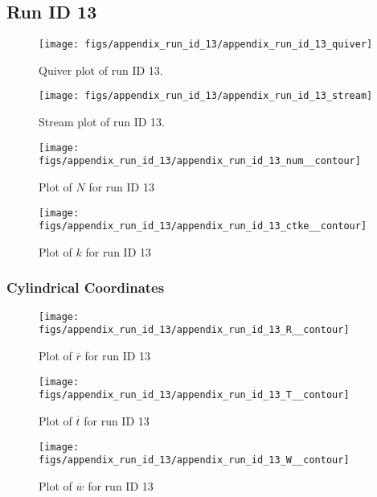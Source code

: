 \subsection{Run ID 13}
\begin{figure}[H]
\centering
\texttt{[image: figs/appendix\_run\_id\_13/appendix\_run\_id\_13\_quiver]}
\caption{Quiver plot of run ID 13.}
\label{fig:appendix_run_id_13_quiver}
\end{figure}


\begin{figure}[H]
\centering
\texttt{[image: figs/appendix\_run\_id\_13/appendix\_run\_id\_13\_stream]}
\caption{Stream plot of run ID 13.}
\label{fig:appendix_run_id_13_stream}
\end{figure}


\begin{figure}[H]
\centering
\texttt{[image: figs/appendix\_run\_id\_13/appendix\_run\_id\_13\_num\_\_contour]}
\caption{Plot of $N$ for run ID 13}
\label{fig:appendix_run_id_13_num__contour}
\end{figure}


\begin{figure}[H]
\centering
\texttt{[image: figs/appendix\_run\_id\_13/appendix\_run\_id\_13\_ctke\_\_contour]}
\caption{Plot of $k$ for run ID 13}
\label{fig:appendix_run_id_13_ctke__contour}
\end{figure}


\subsubsection{Cylindrical Coordinates}
\begin{figure}[H]
\centering
\texttt{[image: figs/appendix\_run\_id\_13/appendix\_run\_id\_13\_R\_\_contour]}
\caption{Plot of $\overline{r}$ for run ID 13}
\label{fig:appendix_run_id_13_R__contour}
\end{figure}


\begin{figure}[H]
\centering
\texttt{[image: figs/appendix\_run\_id\_13/appendix\_run\_id\_13\_T\_\_contour]}
\caption{Plot of $\overline{t}$ for run ID 13}
\label{fig:appendix_run_id_13_T__contour}
\end{figure}


\begin{figure}[H]
\centering
\texttt{[image: figs/appendix\_run\_id\_13/appendix\_run\_id\_13\_W\_\_contour]}
\caption{Plot of $\overline{w}$ for run ID 13}
\label{fig:appendix_run_id_13_W__contour}
\end{figure}


